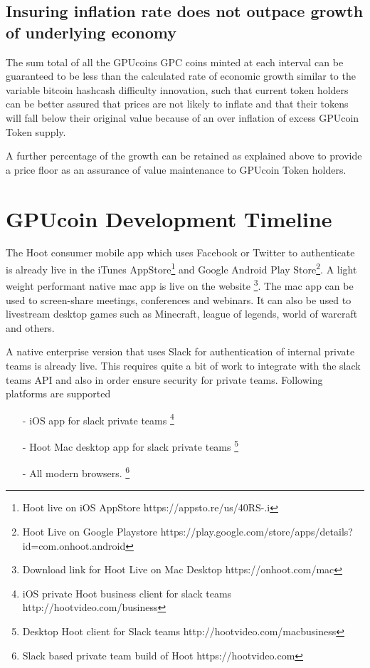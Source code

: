 \documentclass{article}
\begin{document}
\subsection{Insuring inflation rate does not outpace growth of underlying economy}
The sum total of all the GPUcoins GPC coins minted at each interval can be guaranteed to be less than the calculated rate of economic growth similar to the variable bitcoin hashcash difficulty innovation, such that current token holders can be better assured that prices are not likely to inflate and that their tokens will fall below their original value because of an over inflation of excess GPUcoin Token supply.

A further percentage of the growth can be retained as explained above to provide a price floor as an assurance of value maintenance to GPUcoin Token holders. 

\section{GPUcoin Development Timeline}
The Hoot consumer mobile app which uses Facebook or Twitter to authenticate is already live in the iTunes AppStore\footnote{Hoot live on iOS AppStore https://appsto.re/us/40RS-.i} and Google Android Play Store\footnote{Hoot Live on Google Playstore https://play.google.com/store/apps/details?id=com.onhoot.android}.
A light weight performant native mac app is live on
the website \footnote{Download link for Hoot Live on Mac Desktop https://onhoot.com/mac}. The mac app can be used to screen-share meetings, conferences and webinars. It can also be used to livestream desktop games such as Minecraft, league of legends, world of warcraft and others.

A native enterprise version that uses Slack for authentication of internal private teams is already live.
 This requires quite a bit of work to integrate with the slack teams API and also in order ensure security for private teams. Following platforms are supported
\begin{itemize}

\item[-]iOS app for slack private teams \footnote{ iOS private Hoot business client for slack teams http://hootvideo.com/business}
\item[-]Hoot Mac desktop app for slack private teams \footnote{Desktop Hoot client for Slack teams http://hootvideo.com/macbusiness}
\item[-]All modern browsers. \footnote{Slack based private team build of Hoot https://hootvideo.com}
\end{itemize}
\end{document}
